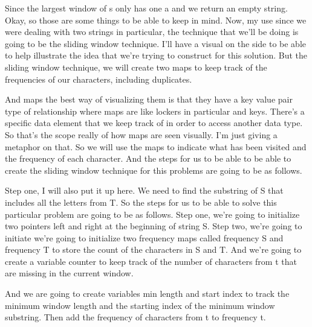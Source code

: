 \expandafter\def\csname sourceexcerpt@47\endcsname{%
Since the largest window of s only has one a and we return an empty string. Okay, so
those are some things to be able to keep in mind. Now, my use since we were dealing
with two strings in particular, the technique that we'll be doing is going to be the
sliding window technique. I'll have a visual on the side to be able to help illustrate
the idea that we're trying to construct for this solution. But the sliding window
technique, we will create two maps to keep track of the frequencies of our characters,
including duplicates.

And maps the best way of visualizing them is that they have a key value pair type of
relationship where maps are like lockers in particular and keys. There's a specific
data element that we keep track of in order to access another data type. So that's the
scope really of how maps are seen visually. I'm just giving a metaphor on that. So we
will use the maps to indicate what has been visited and the frequency of each
character. And the steps for us to be able to be able to create the sliding window
technique for this problems are going to be as follows.

Step one, I will also put it up here. We need to find the substring of S that includes
all the letters from T. So the steps for us to be able to solve this particular
problem are going to be as follows. Step one, we're going to initialize two pointers
left and right at the beginning of string S. Step two, we're going to initiate we're
going to initialize two frequency maps called frequency S and frequency T to store the
count of the characters in S and T. And we're going to create a variable counter to
keep track of the number of characters from t that are missing in the current window.

And we are going to create variables min length and start index to track the minimum
window length and the starting index of the minimum window substring. Then add the
frequency of characters from t to frequency t.
}

